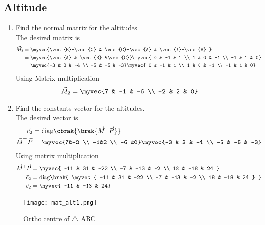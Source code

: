 \documentclass[11pt]{book}
\begin{document}
\subsection{Altitude}

  
\begin{enumerate}[label=\thesubsection.\arabic*.,ref=\thesubsection.\theenumi]
\item Find the normal matrix for the altitudes \\
\solution  The desired matrix is 
\begin{align}
\vec{M}_2 &= \myvec{\vec{B}-\vec{C} & \vec{C}-\vec{A} & \vec{A}-\vec{B} }
\\
&= 
\myvec{\vec{A} & \vec{B} &\vec{C}}
\myvec{ 0 & -1 & 1 \\ 1 & 0 & -1 \\ -1 & 1 & 0} \\
&= 
\myvec{-3 & 3 & -4 \\ -5 & -5 & -3}
\myvec{ 0 & -1 & 1 \\ 1 & 0 & -1 \\ -1 & 1 & 0}
\end{align}
Using Matrix multiplication 
\begin{align}
   \vec{M}_2 &=\myvec{7 & -1 & -6 \\ -2 & 2 & 0}
\end{align}
\item Find the constants vector for the altitudes. \\
\solution The desired vector is 
\begin{align}
\vec{c}_2 &= \text{diag}\cbrak{\brak{\vec{M}^{\top}\vec{P}}} \\
\vec{M}^{\top}\vec{P} &= \myvec{7&-2 \\ -1&2 \\ -6 &0}\myvec{-3 & 3 & -4 \\ -5 & -5 & -3} \\
\end{align}
Using matrix multiplication
\begin{align}
 \vec{M}^{\top}\vec{P}    &=\myvec{ -11 & 31 & -22 \\ -7 & -13 & -2 \\ 18 & -18 & 24 } \\
    \vec{c}_2 &= \text{diag}\brak{ \myvec{ -11 & 31 & -22 \\ -7 & -13 & -2 \\ 18 & -18 & 24 } } \\
 \vec{c}_2   &= \myvec{ -11 & -13 & 24}
\end{align}
\end{enumerate}
\begin{figure}[H]
    \centering
    \texttt{[image: mat\_alt1.png]}
    \caption{Ortho centre of $\triangle$ ABC}
    \label{fig:mat_alt1}
\end{figure}
\end{document}
